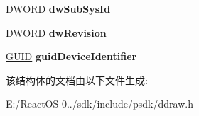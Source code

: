 \begin{DoxyCompactItemize}
\mbox{\label{structtag_d_d_d_e_v_i_c_e_i_d_e_n_t_i_f_i_e_r_a3b51cc87fbf6fbd7716d83836e6c64e3}} 
D\+W\+O\+RD {\bfseries dw\+Sub\+Sys\+Id}
\item 
\mbox{\label{structtag_d_d_d_e_v_i_c_e_i_d_e_n_t_i_f_i_e_r_a5238cc2a8900fb977ba7faa887ee92e8}} 
D\+W\+O\+RD {\bfseries dw\+Revision}
\item 
\mbox{\label{structtag_d_d_d_e_v_i_c_e_i_d_e_n_t_i_f_i_e_r_a6f912d6976dad143a2a0388acd4e27b0}} 
\hyperlink{interface_g_u_i_d}{G\+U\+ID} {\bfseries guid\+Device\+Identifier}
\end{DoxyCompactItemize}


该结构体的文档由以下文件生成\+:\begin{DoxyCompactItemize}
\item 
E\+:/\+React\+O\+S-\/0../sdk/include/psdk/ddraw.\+h\end{DoxyCompactItemize}
